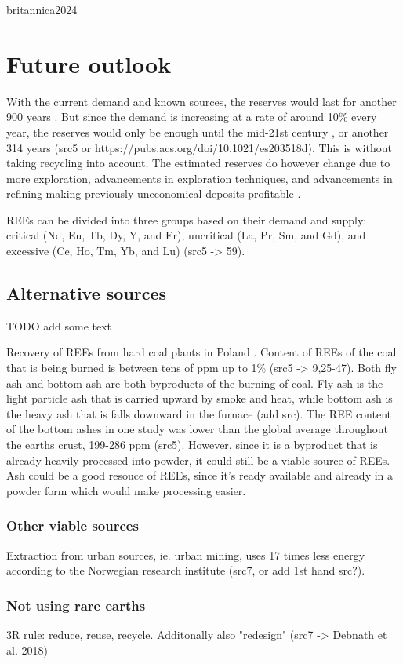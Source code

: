 britannica2024
\section{Future outlook}

With the current demand and known sources, the reserves would last for another 900 years \cite{britannica2024}. But since the demand is increasing at a rate of around 10\% every year, the reserves would only be enough until the mid-21st century \cite{britannica2024}, or another 314 years (src5 or https://pubs.acs.org/doi/10.1021/es203518d). This is without taking recycling into account. The estimated reserves do however change due to more exploration, advancements in exploration techniques, and advancements in refining making previously uneconomical deposits profitable \cite{REETechnology}.

REEs can be divided into three groups based on their demand and supply: critical (Nd, Eu,
Tb, Dy, Y, and Er), uncritical (La, Pr, Sm, and Gd), and excessive (Ce, Ho, Tm, Yb, and Lu) (src5 -> 59).

\subsection{Alternative sources}
TODO add some text


Recovery of REEs from hard coal plants in Poland \cite{USDoE2024}. Content of REEs of the coal that is being burned is between tens of ppm up to 1\% (src5 -> 9,25-47). Both fly ash and bottom ash are both byproducts of the burning of coal. Fly ash is the light particle ash that is carried upward by smoke and heat, while bottom ash is the heavy ash that is falls downward in the furnace (add src). The REE content of the bottom ashes in one study was lower than the global average throughout the earths crust, 199-286 ppm (src5). However, since it is a byproduct that is already heavily processed into powder, it could still be a viable source of REEs. Ash could be a good resouce of REEs, since it's ready available and already in a powder form which would make processing easier.

\subsubsection{Other viable sources}

Extraction from urban sources, ie. urban mining, uses 17 times less energy according to the Norwegian research institute (src7, or add 1st hand src?).

\subsubsection{Not using rare earths}

3R rule: reduce, reuse, recycle. Additonally also "redesign" (src7 -> Debnath et al. 2018)


